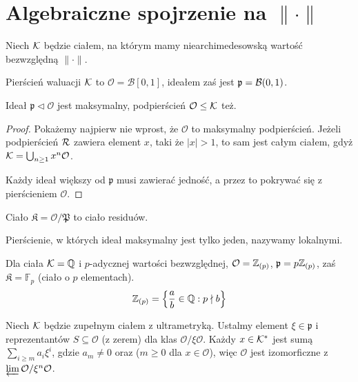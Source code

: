 \section{Algebraiczne spojrzenie na $\|\cdot\|$}
Niech $\mathcal K$ będzie ciałem, na którym mamy niearchimedesowską wartość bezwzględną $\|\cdot\|$.

\begin{definicja}
	Pierścień waluacji $\mathcal K$ to $\mathcal O = \mathcal B[0,1]$, ideałem zaś jest $\mathfrak p = \mathcal B(0, 1)$.
\end{definicja}

\begin{fakt}
	Ideał $\mathfrak p \triangleleft \mathcal O$ jest maksymalny, podpierścień $\mathcal O \le \mathcal K$ też.
\end{fakt}

\begin{proof}
	Pokażemy najpierw nie wprost, że $\mathcal O$ to maksymalny podpierścień.
	Jeżeli podpierścień $\mathcal R$ zawiera element $x$, taki że $|x| > 1$, to sam jest całym ciałem, gdyż $\mathcal K = \bigcup_{n \ge 1} x^n \mathcal O$.

	Każdy ideał większy od $\mathfrak p$ musi zawierać jedność, a przez to pokrywać się z pierścieniem $\mathcal O$.
\end{proof}

\begin{definicja}
	Ciało $\mathfrak K = \mathcal O / \mathfrak P$ to ciało residuów.
\end{definicja}

Pierścienie, w których ideał maksymalny jest tylko jeden, nazywamy lokalnymi.

\begin{fakt}
	Dla ciała $\mathcal K = \mathbb Q$ i $p$-adycznej wartości bezwzględnej,
	$\mathcal O = \mathbb Z_{(p)}$,
	$\mathfrak p = p \mathbb Z_{(p)}$, zaś
	$\mathfrak K = \mathbb F_p$ (ciało o $p$ elementach).
	\[
		\mathbb Z_{(p)} = \left\{ \frac a b \in \mathbb Q : p \nmid b\right\}
	\]
\end{fakt}


\begin{fakt} \label{libresoy}
	Niech $\mathcal K$ będzie zupełnym ciałem z ultrametryką.
	Ustalmy element $\xi \in \mathfrak p$ i reprezentantów $S \subseteq \mathcal O$ (z zerem) dla klas $\mathcal O / \xi \mathcal O$.
	Każdy $x \in \mathcal K^*$ jest sumą $\sum_{i \ge m} a_i \xi^i$, gdzie $a_m \neq 0$ oraz ($m \ge 0$ dla $x \in \mathcal O$), więc $\mathcal O$ jest izomorficzne z $\varprojlim \mathcal O / \xi^n \mathcal O$.
\end{fakt}

